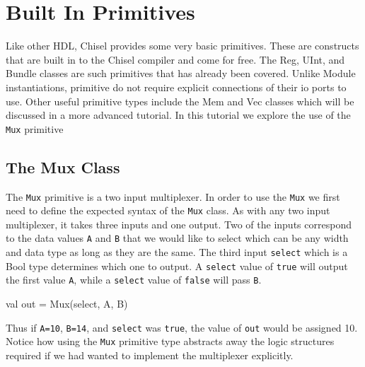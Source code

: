 \section{Built In Primitives}

Like other HDL, Chisel provides some very basic primitives. These are constructs that are built in to the Chisel compiler and come for free. The Reg, UInt, and Bundle classes are such primitives that has already been covered. Unlike Module instantiations, primitive do not require explicit connections of their io ports to use. Other useful primitive types include the Mem and Vec classes which will be discussed in a more advanced tutorial. In this tutorial we explore the use of the \verb+Mux+ primitive

\subsection{The Mux Class}

The \verb+Mux+ primitive is a two input multiplexer. In order to use the \verb+Mux+ we first need to define the expected syntax of the \verb+Mux+ class. As with any two input multiplexer, it takes three inputs and one output. Two of the inputs correspond to the data values \verb+A+ and \verb+B+ that we would like to select which can be any width and data type as long as they are the same. The third input \verb+select+ which is a Bool type determines which one to output.
A \verb+select+ value of \verb+true+ will output the first value \verb+A+, while a \verb+select+ value of \verb+false+ will pass \verb+B+.

\begin{scala}
val out = Mux(select, A, B)
\end{scala}

Thus if \verb+A=10+, \verb+B=14+, and \verb+select+ was \verb+true+, the value of \verb+out+ would be assigned 10. Notice how using the \verb+Mux+ primitive type abstracts away the logic structures required if we had wanted to implement the multiplexer explicitly.


%
%


%
%
%
